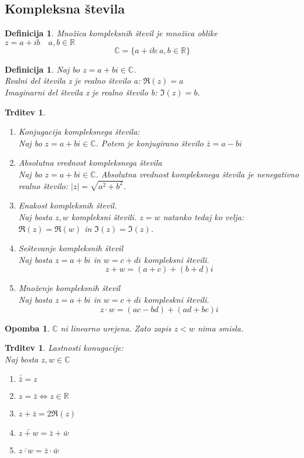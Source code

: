 \documentclass[11pt]{article}
\newtheorem{Trditev}[Izrek]{{\sc Trditev}}
\newtheorem{Definicija}[Izrek]{{\sc Definicija}}
\newtheorem{Opomba}[Izrek]{{\sc Opomba}}
\begin{document}
\subsection{Kompleksna števila}
\begin{Definicija}
	Množica kompleksnih števil je množica oblike \\ $z = a + ib \quad a,b\in \mathbb{R}$
	$$\mathbb{C} = \{a + ib: a,b\in \mathbb{R}\}$$
\end{Definicija}
\begin{Definicija}
	Naj bo $ z = a +bi \in \mathbb{C}$.\\ Realni del števila z je realno število a: $\Re(z) = a$
	\\ Imaginarni del števila z je realno število b: $\Im(z) = b$.
\end{Definicija}
\begin{Trditev}
	\begin{enumerate}
		\item
		Konjugacija kompleksnega števila:
		\\ 
		Naj bo $ z = a +bi \in \mathbb{C}$. Potem je konjugirano število $\bar{z} = a - bi$
		\item
		Absolutna vrednost kompleksnega števila
		\\
		Naj bo $z = a+bi \in \mathbb{C}$. Absolutna vrednost kompleksnega števila je nenegativno realno število: $|z| = \sqrt{a^2 + b^2}$.
		\item
		Enakost kompleksnih števil.
		\\
		Naj bosta $z, w$ kompleksni števili. $z =w$ natanko tedaj ko velja: $\Re(z) = \Re(w)$ in $\Im(z) =\Im(z)$.
		\item
		Seštevanje kompleksnih števil
		\\
		Naj bosta $z = a+ bi$ in $w = c+ di$ kompleksni števili. $$z + w = (a+c) + (b+d)i$$
		\item
		Množenje kompleksnih števil
		\\
		Naj bosta $z = a+bi$ in $ w = c + di$ kompleskni števili.
		$$ z\cdot w = (ac - bd) + (ad + bc)i$$
	\end{enumerate}
\end{Trditev}
\begin{Opomba}
	$\mathbb{C}$ ni linearno urejena. Zato zapis $z < w$ nima smisla.
\end{Opomba}
\begin{Trditev}
	Lastnosti konugacije:
	\\
	Naj bosta $z,w \in \mathbb{C}$
	\begin{enumerate}
		\item
		$\bar{\bar{z}} = z$
		\item
		$ z =\bar{z} \iff z \in \mathbb{R}$
		\item
		$ z + \bar{z} = 2\Re(z)$
		\item
		$\bar{z+w} = \bar{z} + \bar{w}$
		\item
		$\bar{z\cdot w} = \bar{z}\cdot \bar{w}$
	\end{enumerate}
\end{Trditev}
\end{document}
